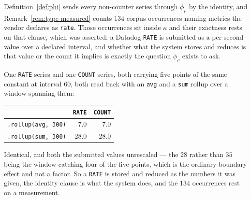 \begin{remark}\label{rem:rate-identity}
Definition~\ref{def:phi} sends every non-counter series through $\phi_\rho$ by the
identity, and Remark~\ref{rem:type-measured} counts $134$ corpus occurrences naming
metrics the vendor declares as \texttt{rate}. Those occurrences sit inside $\kappa$ and
their exactness rests on that clause, which was asserted: a Datadog \texttt{RATE} is
submitted as a per-second value over a declared interval, and whether what the system
stores and reduces is that value or the count it implies is exactly the question
$\phi_\rho$ exists to ask.

One \texttt{RATE} series and one \texttt{COUNT} series, both carrying five points of the
same constant at interval $60$, both read back with an \texttt{avg} and a \texttt{sum}
rollup over a window spanning them:

\begin{center}\footnotesize
\begin{tabular}{@{}lrr@{}}
\toprule
& \texttt{RATE} & \texttt{COUNT} \\
\midrule
\texttt{.rollup(avg, 300)} & $7.0$ & $7.0$ \\
\texttt{.rollup(sum, 300)} & $28.0$ & $28.0$ \\
\bottomrule
\end{tabular}
\end{center}

\noindent
Identical, and both the submitted values unrescaled --- the $28$ rather than $35$ being
the window catching four of the five points, which is the ordinary boundary effect and
not a factor. So a \texttt{RATE} is stored and reduced as the numbers it was given, the
identity clause is what the system does, and the $134$ occurrences rest on a
measurement.
\end{remark}

